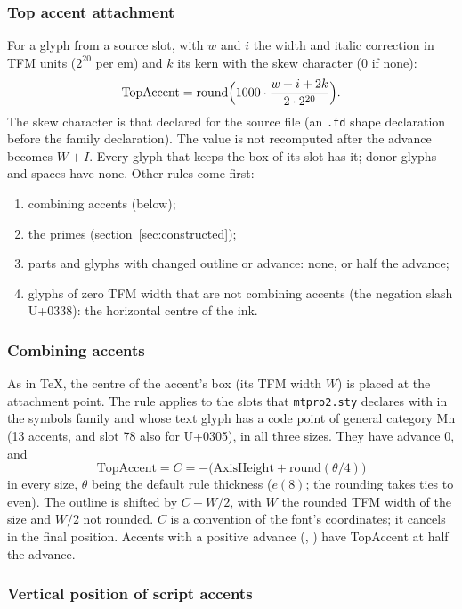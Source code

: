 \documentclass[10pt]{article}
\newcommand\file[1]{\texttt{#1}}
\newcommand\code[1]{\texttt{#1}}
\newcommand\U[1]{U+#1}
\begin{document}
\subsubsection{Top accent attachment}

For a glyph from a source slot, with $w$ and $i$ the width and italic
correction in TFM units ($2^{20}$ per em) and $k$ its kern with the
skew character (0 if none):
\[
  \mathrm{TopAccent} = \mathrm{round}\Bigl(1000\cdot
    \frac{w + i + 2k}{2\cdot2^{20}}\Bigr).
\]
The skew character is that declared for the source file (an \file{.fd}
shape declaration before the family declaration).  The value is not
recomputed after the advance becomes $W + I$.  Every glyph that keeps
the box of its slot has it; donor glyphs and spaces have none.  Other
rules come first:
\begin{enumerate}
\item combining accents (below);
\item the primes (section~\ref{sec:constructed});
\item parts and glyphs with changed outline or advance: none, or half
  the advance;
\item glyphs of zero TFM width that are not combining accents (the
  negation slash \U{0338}): the horizontal centre of the ink.
\end{enumerate}

\subsubsection{Combining accents}

As in \TeX, the centre of the accent's box (its TFM width $W$) is
placed at the attachment point.  The rule applies to the slots that
\file{mtpro2.sty} declares with \code{\string\DeclareMathAccent} in the
symbols family and whose text glyph has a code point of general
category Mn (13 accents, and slot 78 also for \U{0305}), in all three
sizes.  They have advance 0, and
\[
  \mathrm{TopAccent} = C = -\bigl(\mathrm{AxisHeight} +
  \mathrm{round}(\theta/4)\bigr)
\]
in every size, $\theta$ being the default rule thickness
($e(8)$; the rounding takes ties to even).  The
outline is shifted by $C - W/2$, with $W$ the rounded TFM width of the
size and $W/2$ not rounded.  $C$ is a convention of the font's
coordinates; it cancels in the final position.  Accents with a positive
advance (\code{\string\wbar}, \code{\string\wwbar}) have TopAccent at
half the advance.

\subsubsection{Vertical position of script accents}\label{sec:accentheight}
\end{document}
